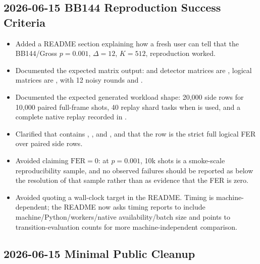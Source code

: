 \subsection*{2026-06-15 BB144 Reproduction Success Criteria}

\begin{itemize}
\item Added a README section explaining how a fresh user can tell that the BB144/Gross \(p=0.001\), \(\Delta=12\), \(K=512\), \texttt{} reproduction worked.
\item Documented the expected \texttt{} matrix output: \texttt{} and \texttt{} detector matrices are \texttt{}, logical matrices are \texttt{}, with 12 noisy rounds and \texttt{}.
\item Documented the expected generated workload shape: 20,000 side rows for 10,000 paired full-frame shots, 40 replay shard tasks when \texttt{} is used, and a complete native replay recorded in \texttt{}.
\item Clarified that \texttt{} contains \texttt{}, \texttt{}, and \texttt{}, and that the \texttt{} row is the strict full logical FER over paired side rows.
\item Avoided claiming \(\mathrm{FER}=0\): at \(p=0.001\), 10k shots is a smoke-scale reproducibility sample, and no observed failures should be reported as below the resolution of that sample rather than as evidence that the FER is zero.
\item Avoided quoting a wall-clock target in the README. Timing is machine-dependent; the README now asks timing reports to include machine/Python/workers/native availability/batch size and points to transition-evaluation counts for more machine-independent comparison.
\end{itemize}

\subsection*{2026-06-15 Minimal Public Cleanup}

